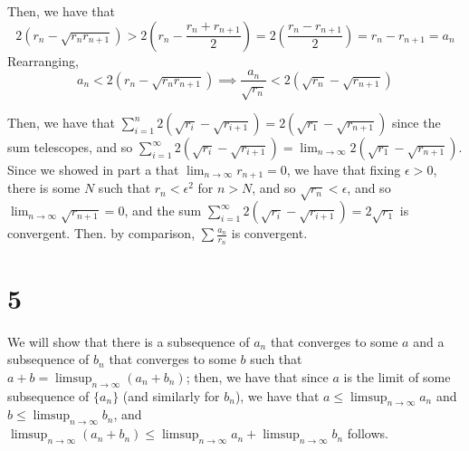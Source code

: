 \documentclass[12pt,letterpaper]{article}
\theoremstyle{definition}
\begin{document}
Then, we have that
\[
  2(r_{n} - \sqrt{r_{n}r_{n+1}}) > 2\left(r_{n} - \frac{r_{n} + r_{n+1}}{2}\right) = 2\left(\frac{r_{n} - r_{n+1}}{2}\right) = r_{n} - r_{n+1} = a_{n}
\]
Rearranging,
\[
  a_{n} < 2(r_{n} - \sqrt{r_{n}r_{n+1}}) \implies \frac{a_{n}}{\sqrt{r_{n}}} < 2(\sqrt{r_{n}} - \sqrt{r_{n+1}})
\]

Then, we have that $\sum_{i=1}^{n}2(\sqrt{r_{i}} - \sqrt{r_{i+1}}) = 2(\sqrt{r_{1}} - \sqrt{r_{n+1}})$ since the sum telescopes, and so $\sum_{i=1}^{\infty}2(\sqrt{r_{i}} - \sqrt{r_{i+1}}) = \lim_{n \rightarrow \infty}2(\sqrt{r_{1}} - \sqrt{r_{n+1}})$. Since we showed in part a that $\lim_{n \rightarrow \infty}r_{n+1} = 0$, we have that fixing $\epsilon > 0$, there is some $N$ such that $r_{n} < \epsilon^{2}$ for $n > N$, and so $\sqrt{r_{n}} < \epsilon$, and so $\lim_{n \rightarrow \infty}\sqrt{r_{n+1}} = 0$, and the sum $\sum_{i=1}^{\infty}2(\sqrt{r_{i}} - \sqrt{r_{i+1}}) = 2\sqrt{r_{1}}$ is convergent. Then. by comparison, $\sum \frac{a_{n}}{r_{n}}$ is convergent.

\section*{5}


We will show that there is a subsequence of $a_{n}$ that converges to some $a$ and a subsequence of $b_{n}$ that converges to some $b$ such that $a + b = \limsup_{n \rightarrow \infty}(a_{n} + b_{n})$; then, we have that since $a$ is the limit of some subsequence of $\{a_{n}\}$ (and similarly for $b_{n}$), we have that $a \leq \limsup_{n \rightarrow \infty}a_{n}$ and $b \leq \limsup_{n \rightarrow \infty}b_{n}$, and $\limsup_{n \rightarrow \infty}(a_{n} + b_{n}) \leq \limsup_{n \rightarrow \infty}a_{n} + \limsup_{n \rightarrow \infty}b_{n}$ follows.
\end{document}
